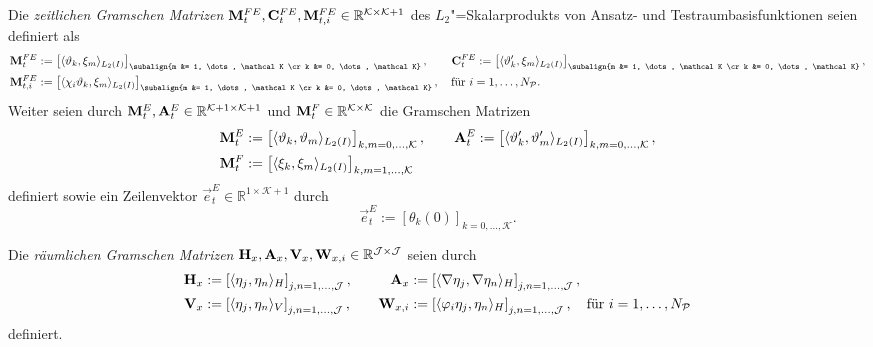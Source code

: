 \documentclass[../main.tex]{subfiles}
\begin{document}
\begin{Definition}
\label{definition:zeitliche_bausteine}
    Die \emph{zeitlichen Gramschen Matrizen} $\mathbf{M}_{t}^{FE}, \mathbf{C}_{t}^{FE}, \mathbf{M}_{t,i}^{FE} \in \mathbb{R}^{\mathcal K \times \mathcal K + 1}$ des $L_{2}$"=Skalarprodukts von Ansatz- und Testraumbasisfunktionen seien definiert als
    \begin{align}
        \mat{M}_{t}^{FE} &:= \left[ \skp{\theta_{k}}{\xi_{m}}{L_{2}(I)} \right]_{\subalign{m &= 1, \dots, \mathcal K \cr k &= 0, \dots, \mathcal K}},
        \qquad
        \mat{C}_{t}^{FE} := \left[ \skp{\theta_{k}'}{\xi_{m}}{L_{2}(I)} \right]_{\subalign{m &= 1, \dots, \mathcal K \cr k &= 0, \dots, \mathcal K}},
        \\
        \mat{M}_{t,i}^{FE} &:= \left[ \skp{\chi_{i}\theta_{k}}{\xi_{m}}{L_{2}(I)} \right]_{\subalign{m &= 1, \dots, \mathcal K \cr k &= 0, \dots, \mathcal K}}, \quad \text{für } i = 1, \dots, N_{\mathcal P}.
    \end{align}
    Weiter seien durch $\mathbf{M}_{t}^{E}, \mathbf{A}_{t}^{E} \in \mathbb{R}^{\mathcal K + 1\times \mathcal K + 1}$ und $\mathbf{M}_{t}^{F} \in \mathbb{R}^{\mathcal K \times \mathcal K}$ die Gramschen Matrizen
    \begin{align}
        \mathbf{M}_{t}^{E} &:= \left[ \langle\vartheta_{k},\vartheta_{m}\rangle_{L_{2}(I)}\right]_{k,m = 0, \dots, \mathcal K},
        \qquad
        \mathbf{A}_{t}^{E} := \left[ \langle\vartheta_{k}',\vartheta_{m}'\rangle_{L_{2}(I)}\right]_{k,m = 0, \dots, \mathcal K},
        \\
        \mathbf{M}_{t}^{F} &:= \left[ \langle\xi_{k},\xi_{m}\rangle_{L_{2}(I)}\right]_{k,m = 1, \dots, \mathcal K}
    \end{align}
    definiert sowie ein Zeilenvektor $\vec{e}^{E}_{t} \in \mathbb{R}^{1 \times \mathcal K + 1}$ durch
    \begin{equation}
        \vec{e}^{E}_{t} := \left[ \theta_{k}(0) \right]_{k = 0, \dots, \mathcal K}.
    \end{equation}
\end{Definition}

\begin{Definition}
\label{definition:raeumliche_bausteine}
    Die \emph{räumlichen Gramschen Matrizen} $\mathbf{H}_{x}, \mathbf{A}_{x}, \mathbf{V}_{x}, \mathbf{W}_{x,i} \in \mathbb{R}^{\mathcal J \times \mathcal J}$ seien durch
    \begin{equation}
    \begin{aligned}
        \mathbf{H}_{x} &:= \left[ \langle\eta_{j},\eta_{n}\rangle_{H} \right]_{j,n=1, \dots, \mathcal J},&
        \quad
        \mathbf{A}_{x} &:= \left[ \langle\nabla \eta_{j},\nabla \eta_{n}\rangle_{H} \right]_{j,n=1, \dots, \mathcal J},
        \\
        \mathbf{V}_{x} &:= \left[ \langle\eta_{j},\eta_{n}\rangle_{V} \right]_{j,n = 1, \dots, \mathcal J},&
        \quad
        \mathbf{W}_{x,i} &:= \left[ \langle\varphi_{i} \eta_{j},\eta_{n}\rangle_{H} \right]_{j, n = 1, \dots, \mathcal J}, \quad \text{für } i = 1, \dots, N_{\mathcal P}
    \end{aligned}
    \end{equation}
    definiert.
\end{Definition}
\end{document}
